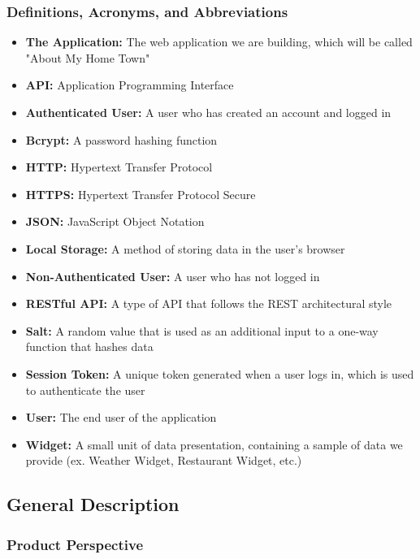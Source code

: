 \documentclass[12pt]{article}
\begin{document}
\subsubsection{Definitions, Acronyms, and Abbreviations}

\begin{itemize}
    \item \textbf{The Application:} The web application we are building, which will be called "About My Home Town"
    \item \textbf{API:} Application Programming Interface
    \item \textbf{Authenticated User:} A user who has created an account and logged in
    \item \textbf{Bcrypt:} A password hashing function
    \item \textbf{HTTP:} Hypertext Transfer Protocol
    \item \textbf{HTTPS:} Hypertext Transfer Protocol Secure
    \item \textbf{JSON:} JavaScript Object Notation
    \item \textbf{Local Storage:} A method of storing data in the user's browser
    \item \textbf{Non-Authenticated User:} A user who has not logged in
    \item \textbf{RESTful API:} A type of API that follows the REST architectural style
    \item \textbf{Salt:} A random value that is used as an additional input to a one-way function that hashes data
    \item \textbf{Session Token:} A unique token generated when a user logs in, which is used to authenticate the user
    \item \textbf{User:} The end user of the application
    \item \textbf{Widget:} A small unit of data presentation, containing a sample of data we provide (ex. Weather Widget, Restaurant Widget, etc.)
\end{itemize}

\subsection{General Description}

\subsubsection{Product Perspective}
\end{document}
